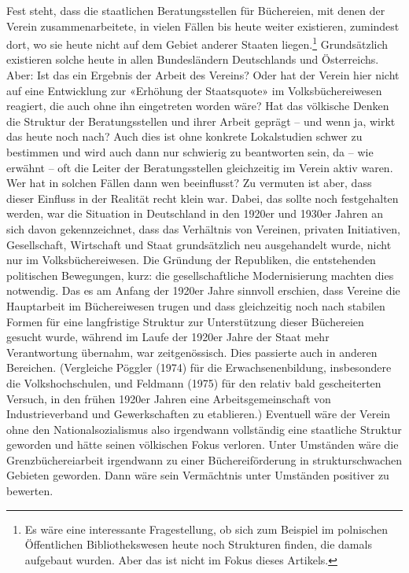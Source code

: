 \documentclass[a4paper,
fontsize=11pt,
oneside,
numbers=noperiodatend,
parskip=half-,
bibliography=totoc,
final
]{scrartcl}
\begin{document}
Fest steht, dass die staatlichen Beratungsstellen für Büchereien, mit
denen der Verein zusammenarbeitete, in vielen Fällen bis heute weiter
existieren, zumindest dort, wo sie heute nicht auf dem Gebiet anderer
Staaten liegen.\footnote{Es wäre eine interessante Fragestellung, ob
  sich zum Beispiel im polnischen Öffentlichen Bibliothekswesen heute
  noch Strukturen finden, die damals aufgebaut wurden. Aber das ist
  nicht im Fokus dieses Artikels.} Grundsätzlich existieren solche heute
in allen Bundesländern Deutschlands und Österreichs. Aber: Ist das ein
Ergebnis der Arbeit des Vereins? Oder hat der Verein hier nicht auf eine
Entwicklung zur «Erhöhung der Staatsquote» im Volksbüchereiwesen
reagiert, die auch ohne ihn eingetreten worden wäre? Hat das völkische
Denken die Struktur der Beratungsstellen und ihrer Arbeit geprägt -- und
wenn ja, wirkt das heute noch nach? Auch dies ist ohne konkrete
Lokalstudien schwer zu bestimmen und wird auch dann nur schwierig zu
beantworten sein, da -- wie erwähnt -- oft die Leiter der
Beratungsstellen gleichzeitig im Verein aktiv waren. Wer hat in solchen
Fällen dann wen beeinflusst? Zu vermuten ist aber, dass dieser Einfluss
in der Realität recht klein war. Dabei, das sollte noch festgehalten
werden, war die Situation in Deutschland in den 1920er und 1930er Jahren
an sich davon gekennzeichnet, dass das Verhältnis von Vereinen, privaten
Initiativen, Gesellschaft, Wirtschaft und Staat grundsätzlich neu
ausgehandelt wurde, nicht nur im Volksbüchereiwesen. Die Gründung der
Republiken, die entstehenden politischen Bewegungen, kurz: die
gesellschaftliche Modernisierung machten dies notwendig. Das es am
Anfang der 1920er Jahre sinnvoll erschien, dass Vereine die Hauptarbeit
im Büchereiwesen trugen und dass gleichzeitig noch nach stabilen Formen
für eine langfristige Struktur zur Unterstützung dieser Büchereien
gesucht wurde, während im Laufe der 1920er Jahre der Staat mehr
Verantwortung übernahm, war zeitgenössisch. Dies passierte auch in
anderen Bereichen. (Vergleiche Pöggler (1974) für die
Erwachsenenbildung, insbesondere die Volkshochschulen, und Feldmann
(1975) für den relativ bald gescheiterten Versuch, in den frühen 1920er
Jahren eine Arbeitsgemeinschaft von Industrieverband und Gewerkschaften
zu etablieren.) Eventuell wäre der Verein ohne den Nationalsozialismus
also irgendwann vollständig eine staatliche Struktur geworden und hätte
seinen völkischen Fokus verloren. Unter Umständen wäre die
Grenzbüchereiarbeit irgendwann zu einer Büchereiförderung in
strukturschwachen Gebieten geworden. Dann wäre sein Vermächtnis unter
Umständen positiver zu bewerten.
\end{document}
